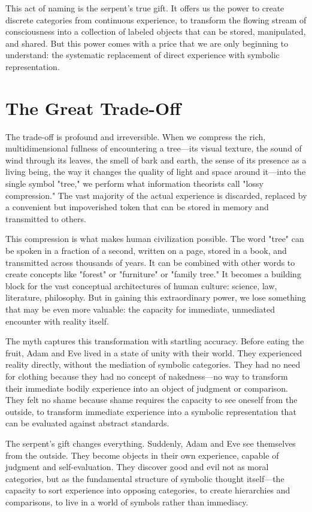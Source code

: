 This act of naming is the serpent's true gift. It offers us the power to create discrete categories from continuous experience, to transform the flowing stream of consciousness into a collection of labeled objects that can be stored, manipulated, and shared. But this power comes with a price that we are only beginning to understand: the systematic replacement of direct experience with symbolic representation.

\section{The Great Trade-Off}

The trade-off is profound and irreversible. When we compress the rich, multidimensional fullness of encountering a tree—its visual texture, the sound of wind through its leaves, the smell of bark and earth, the sense of its presence as a living being, the way it changes the quality of light and space around it—into the single symbol "tree," we perform what information theorists call "lossy compression." The vast majority of the actual experience is discarded, replaced by a convenient but impoverished token that can be stored in memory and transmitted to others.

This compression is what makes human civilization possible. The word "tree" can be spoken in a fraction of a second, written on a page, stored in a book, and transmitted across thousands of years. It can be combined with other words to create concepts like "forest" or "furniture" or "family tree." It becomes a building block for the vast conceptual architectures of human culture: science, law, literature, philosophy. But in gaining this extraordinary power, we lose something that may be even more valuable: the capacity for immediate, unmediated encounter with reality itself.

The myth captures this transformation with startling accuracy. Before eating the fruit, Adam and Eve lived in a state of unity with their world. They experienced reality directly, without the mediation of symbolic categories. They had no need for clothing because they had no concept of nakedness—no way to transform their immediate bodily experience into an object of judgment or comparison. They felt no shame because shame requires the capacity to see oneself from the outside, to transform immediate experience into a symbolic representation that can be evaluated against abstract standards.

The serpent's gift changes everything. Suddenly, Adam and Eve see themselves from the outside. They become objects in their own experience, capable of judgment and self-evaluation. They discover good and evil not as moral categories, but as the fundamental structure of symbolic thought itself—the capacity to sort experience into opposing categories, to create hierarchies and comparisons, to live in a world of symbols rather than immediacy.

